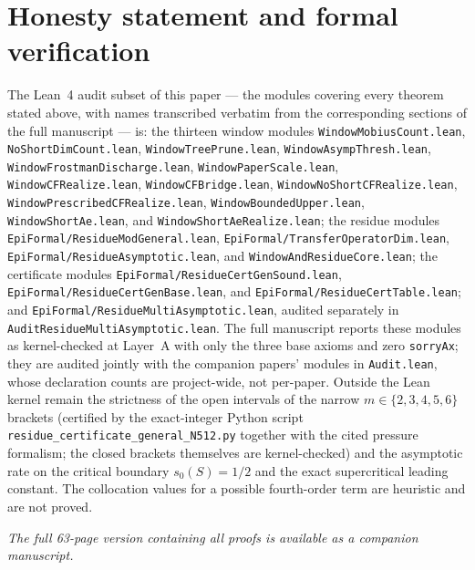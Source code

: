 \section*{Honesty statement and formal verification}

The Lean~4 audit subset of this paper --- the modules covering every theorem
stated above, with names transcribed verbatim from the corresponding sections
of the full manuscript --- is: the thirteen window modules
\texttt{WindowMobiusCount.lean}, \texttt{NoShortDimCount.lean},
\texttt{WindowTreePrune.lean}, \texttt{WindowAsympThresh.lean},
\texttt{WindowFrostmanDischarge.lean}, \texttt{WindowPaperScale.lean},
\texttt{WindowCFRealize.lean}, \texttt{WindowCFBridge.lean},
\texttt{WindowNoShortCFRealize.lean}, \texttt{WindowPrescribedCFRealize.lean},
\texttt{WindowBoundedUpper.lean}, \texttt{WindowShortAe.lean}, and
\texttt{WindowShortAeRealize.lean}; the residue modules
\texttt{EpiFormal/ResidueModGeneral.lean},
\texttt{EpiFormal/TransferOperatorDim.lean},
\texttt{EpiFormal/ResidueAsymptotic.lean}, and
\texttt{WindowAndResidueCore.lean}; the certificate modules
\texttt{EpiFormal/ResidueCertGenSound.lean},
\texttt{EpiFormal/ResidueCertGenBase.lean}, and
\texttt{EpiFormal/ResidueCertTable.lean}; and
\texttt{EpiFormal/ResidueMultiAsymptotic.lean}, audited separately in
\texttt{AuditResidueMultiAsymptotic.lean}. The full manuscript reports these
modules as kernel-checked at Layer~A with only the three base axioms and zero
\texttt{sorryAx}; they are audited jointly with the companion papers' modules
in \texttt{Audit.lean}, whose declaration counts are project-wide, not
per-paper. Outside the Lean kernel remain the strictness of the open intervals
of the narrow $m\in\{2,3,4,5,6\}$ brackets (certified by the exact-integer
Python script \texttt{residue\_certificate\_general\_N512.py} together with
the cited pressure formalism; the closed brackets themselves are
kernel-checked) and the asymptotic rate on the critical boundary
$s_0(S)=1/2$ and the exact supercritical leading constant. The collocation
values for a possible fourth-order term are heuristic and are not proved.

\emph{The full 63-page version containing all proofs is available as a companion manuscript.}
